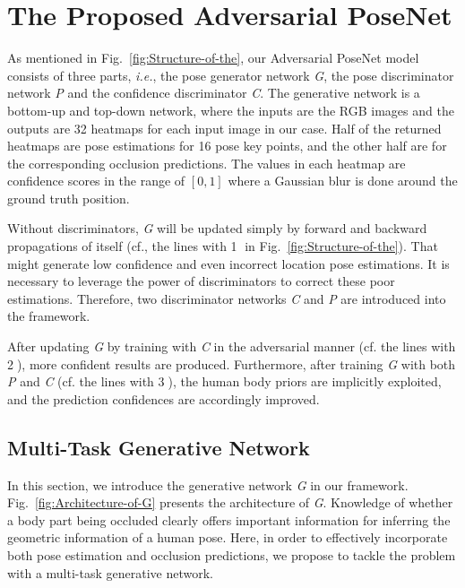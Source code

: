 \documentclass[10pt,letterpaper,twocolumn]{article}
\begin{document}
\section{The Proposed Adversarial PoseNet}\label{sec:GcNet-for-Human}

As mentioned in Fig.~\ref{fig:Structure-of-the}, our Adversarial PoseNet model consists of three parts, \emph{i.e.}, the pose generator network \textit{G}, the pose discriminator network \textit{P} and the confidence discriminator \textit{C}. The generative network is a bottom-up and top-down network, where the inputs are the RGB images and the outputs are 32 heatmaps for each input image in our case. Half of the returned heatmaps are pose estimations for 16 pose key points, and the other half are for the corresponding occlusion predictions. The values in each heatmap are confidence scores in the range of $\left[0,1\right]$ where a Gaussian blur is done around the ground truth position.

Without discriminators, \textit{G} will be updated simply by forward and backward propagations of itself ({cf.}, the lines with \textcircled{1} in Fig.~\ref{fig:Structure-of-the}). That might generate low confidence and even incorrect location pose estimations. It is necessary to leverage the power of discriminators to correct these poor estimations. Therefore, two discriminator networks \emph{C} and \emph{P} are introduced into the framework.

After updating \textit{G} by training with \textit{C} in the adversarial manner (cf. the lines with \textcircled{2}), more confident results are produced. Furthermore, after training \textit{G} with both \textit{P} and \textit{C} (cf. the lines with \textcircled{3}), the human body priors are  implicitly exploited,  and the prediction confidences are accordingly improved.

\subsection{Multi-Task Generative Network}\label{subsec:Multi-task-Generative-Network}

In this section, we introduce the generative network \emph{G} in our framework. Fig.~\ref{fig:Architecture-of-G} presents the architecture of \emph{G}.
Knowledge of whether a body part being occluded clearly offers important information for inferring the geometric information of a human pose. Here, in order to effectively incorporate both pose estimation and occlusion predictions, we propose to tackle the problem with a multi-task generative network.
\end{document}
